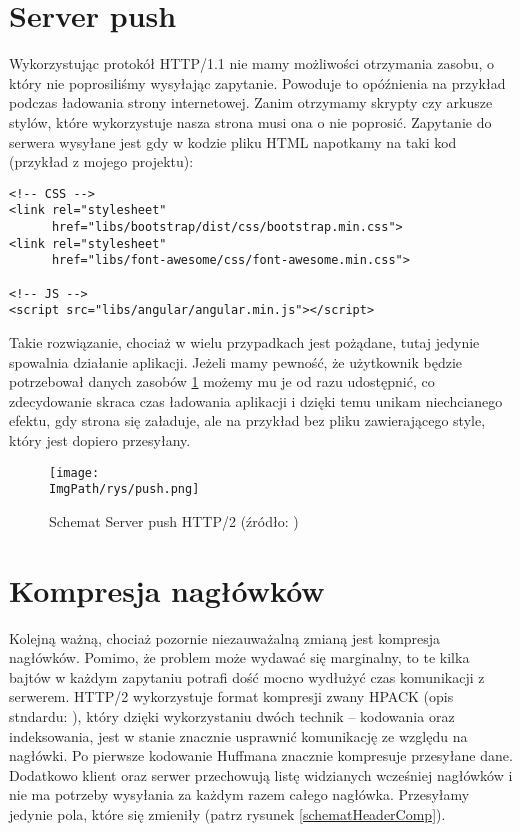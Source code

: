 \documentclass[a4paper,12pt,twoside,openany]{report}
\newcommand{\ImgPath}{.}
\begin{document}
\section{Server push}
\label{sectionServerPush}

Wykorzystując protokół HTTP/1.1 nie mamy możliwości otrzymania zasobu, o który nie poprosiliśmy wysyłając zapytanie.
Powoduje to opóźnienia na przykład podczas ładowania strony internetowej.
Zanim otrzymamy skrypty czy arkusze stylów, które wykorzystuje nasza strona musi ona o nie poprosić.
Zapytanie do serwera wysyłane jest gdy w kodzie pliku HTML napotkamy na taki kod (przykład z mojego projektu):
\begin{lstlisting}
<!-- CSS -->
<link rel="stylesheet"
	  href="libs/bootstrap/dist/css/bootstrap.min.css">
<link rel="stylesheet"
      href="libs/font-awesome/css/font-awesome.min.css">

<!-- JS -->
<script src="libs/angular/angular.min.js"></script>
\end{lstlisting}
Takie rozwiązanie, chociaż w wielu przypadkach jest pożądane, tutaj jedynie spowalnia działanie aplikacji.
Jeżeli mamy pewność, że użytkownik będzie potrzebował danych zasobów \ref{schematPush} możemy mu je od razu udostępnić, co zdecydowanie skraca czas ładowania aplikacji i dzięki temu unikam niechcianego efektu, gdy strona się załaduje, ale na przykład bez pliku zawierającego style, który jest dopiero przesyłany.
\begin{figure}[!htbp]
	\begin{center}
\centering
\texttt{[image: \\ImgPath/rys/push.png]}
\end{center}
	\caption{Schemat Server push HTTP/2 (źródło: \cite{http2Fundamentals})}
	\label{schematPush}
\end{figure}

\section{Kompresja nagłówków}

Kolejną ważną, chociaż pozornie niezauważalną zmianą jest kompresja nagłówków.
Pomimo, że problem może wydawać się marginalny, to te kilka bajtów w każdym zapytaniu potrafi dość mocno wydłużyć czas komunikacji z serwerem.
HTTP/2 wykorzystuje format kompresji zwany HPACK (opis stndardu: \cite{hpack}), który dzięki wykorzystaniu dwóch technik -- kodowania oraz indeksowania, jest w stanie znacznie usprawnić komunikację ze względu na nagłówki.
Po pierwsze kodowanie Huffmana znacznie kompresuje przesyłane dane.
Dodatkowo klient oraz serwer przechowują listę widzianych wcześniej nagłówków i nie ma potrzeby wysyłania za każdym razem całego nagłówka.
Przesyłamy jedynie pola, które się zmieniły (patrz rysunek \ref{schematHeaderComp}).
\end{document}
